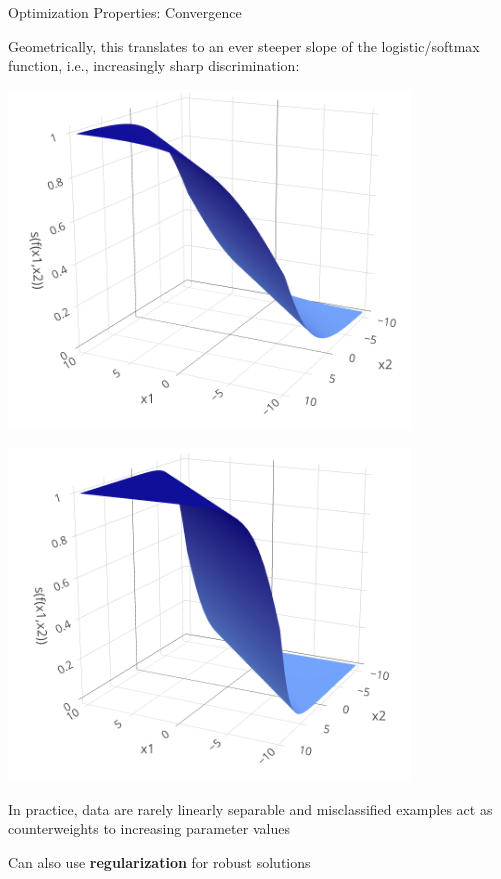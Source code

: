 \documentclass[11pt,compress,t,notes=noshow, xcolor=table]{beamer}
\begin{document}
\begin{vbframe}{Optimization Properties: Convergence}
\framebreak

\begin{itemizeL}
\item
Geometrically, this translates to an ever steeper slope of the 
logistic/softmax function, i.e., increasingly sharp discrimination:

\vspace{0.3cm}
\begin{minipage}[b]{0.5\textwidth}
\includegraphics[width=0.8\textwidth]{figure/softmax_1}
\end{minipage}%
\begin{minipage}[b]{0.5\textwidth}
\includegraphics[width=0.8\textwidth]{figure/softmax_2}
\end{minipage}%
\item In practice, data are rarely linearly separable and misclassified 
examples act as counterweights to increasing parameter values
\item Can also use \textbf{regularization} for  robust solutions
\end{itemizeL}

\end{vbframe}


\endlecture
\end{document}
